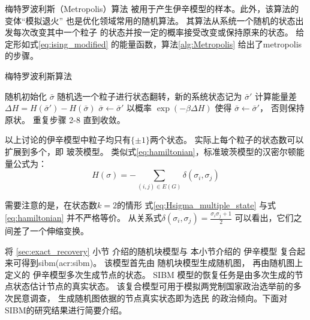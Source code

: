 
梅特罗波利斯（Metropolis）算法\cite{metropolis1953equation}
被用于产生伊辛模型的样本。此外，该算法的变体“模拟退火”
\cite{pincus1970monte} 也是优化领域常用的随机算法。
其算法从系统一个随机的状态出发每次改变其中一个粒子
的状态并按一定的概率接受改变或保持原来的状态。
给定形如式\eqref{eq:ising_modified}
的能量函数，算法\ref{alg:Metropolis}
给出了\gls{metropolis}的步骤。

\begin{algorithm}
  \caption{梅特罗波利斯算法}\label{alg:Metropolis}
  \begin{algorithmic}[1]
    \STATE 随机初始化 $\bar{\sigma}$
    \STATE 随机选一个粒子进行状态翻转，新的系统状态记为 $\bar{\sigma}'$ 
    \STATE 计算能量差 $\Delta H= H(\bar{\sigma}') - H(\bar{\sigma})$
    \STATE $\bar{\sigma} \leftarrow \bar{\sigma}'$
    \ELSE
    \STATE 以概率 $\exp(-\beta \Delta H)$ 
    使得 $\bar{\sigma} \leftarrow \bar{\sigma}'$，
    否则保持原状。 
    \ENDIF
    \STATE 重复步骤 2-8 直到收敛。
\end{algorithmic}  
\end{algorithm}

以上讨论的伊辛模型中粒子均只有$\{\pm 1\}$两个状态。
实际上每个粒子的状态数可以扩展到多个，即 玻茨模型\cite{potts1952some}。
类似式\eqref{eq:hamiltonian}，标准玻茨模型的汉密尔顿能量公式为：
\begin{equation}\label{eq:Hsigma_multiple_state}
  H(\sigma) = -\sum_{(i,j) \in E(G)}\delta(\sigma_i, \sigma_j)
\end{equation}
\begin{remark}\label{rem:equivalence_H_energy}
需要注意的是，在状态数$k=2$的情形
式\eqref{eq:Hsigma_multiple_state} 
与式\eqref{eq:hamiltonian}
并不严格等价。
从关系式$\delta(\sigma_i, \sigma_j) = \frac{\sigma_i \sigma_j + 1}{2}$
可以看出，它们之间差了一个伸缩变换。
\end{remark}

将 \ref{sec:exact_recovery} 小节 介绍的随机块模型与 本小节介绍的 伊辛模型
复合起来可得到\gls{sibm}(\gls{acr:sibm})\cite{ye2020exact}。
该模型首先由 随机块模型生成随机图，
再由随机图上定义的 伊辛模型多次生成节点的状态。
SIBM 模型的恢复任务是由多次生成的节点状态估计节点的真实状态。
该复合模型可用于模拟两党制国家政治选举前的多次民意调查，
生成随机图依据的节点真实状态即为选民
的政治倾向。下面对SIBM的研究结果进行简要介绍。

